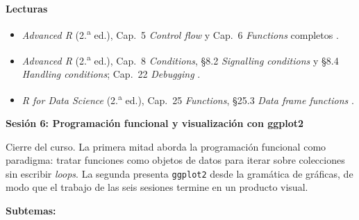 \documentclass[11pt,letterpaper]{article}
\newcommand{\sesion}[2]{%
  \bigskip%
  {\color{main}\Large\bfseries Sesión #1: #2\par}%
  \smallskip%
}
\begin{document}
\medskip
\noindent\textbf{Lecturas}
\begin{itemize}[leftmargin=*, itemsep=1pt]
    \item \textit{Advanced R} (2.\textsuperscript{a} ed.), Cap.\ 5 \textit{Control flow} y Cap.\ 6 \textit{Functions} completos \cite{wickham2019advr}.
    \item \textit{Advanced R} (2.\textsuperscript{a} ed.), Cap.\ 8 \textit{Conditions}, §8.2 \textit{Signalling conditions} y §8.4 \textit{Handling conditions}; Cap.\ 22 \textit{Debugging} \cite{wickham2019advr}.
    \item \textit{R for Data Science} (2.\textsuperscript{a} ed.), Cap.\ 25 \textit{Functions}, §25.3 \textit{Data frame functions} \cite{wickham2023r4ds}.
\end{itemize}

\sesion{6}{Programación funcional y visualización con ggplot2}

Cierre del curso. La primera mitad aborda la programación funcional como paradigma: tratar funciones como objetos de datos para iterar sobre colecciones sin escribir \textit{loops}. La segunda presenta \texttt{ggplot2} desde la gramática de gráficas, de modo que el trabajo de las seis sesiones termine en un producto visual.

\textbf{Subtemas:}
\end{document}
